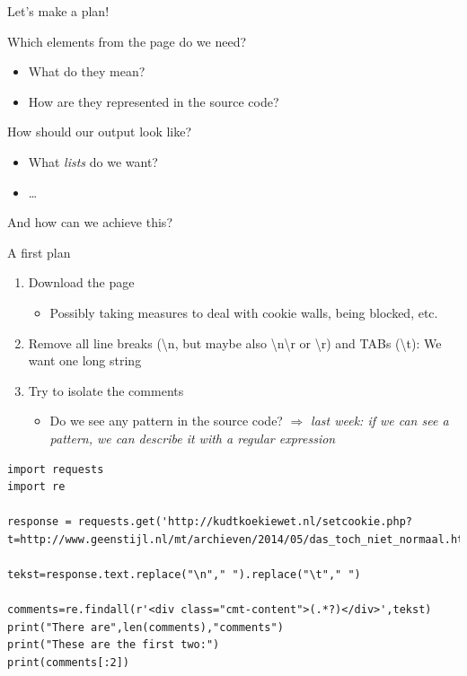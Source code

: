 \documentclass{beamer}
\begin{document}
\begin{frame}{Let's make a plan!}
\begin{block}{Which elements from the page do we need?}
\begin{itemize}
\item What do they mean?
\item How are they represented in the source code?
\end{itemize}
\end{block}
\begin{block}{How should our output look like?}
\begin{itemize}
\item What \emph{lists} do we want?
\item \ldots
\end{itemize}
\end{block}
And how can we achieve this?
\end{frame}


\begin{frame}{}
\begin{block}{A first plan}
\begin{enumerate}
\item<2-> Download the page
   \begin{itemize}
   \item<3-> Possibly taking measures to deal with cookie walls, being blocked, etc.
   \end{itemize}
\item<4-> Remove all line breaks (\textbackslash n, but maybe also \textbackslash n\textbackslash r or \textbackslash r) and TABs (\textbackslash t): We want one long string
\item<5-> Try to isolate the comments
   \begin{itemize}
   	\item<5-> Do we see any pattern in the source code? $\Rightarrow$ \emph{last week: if we can see a pattern, we can describe it with a regular expression}
   \end{itemize}
\end{enumerate}
\end{block}

\end{frame}

\begin{frame}
\begin{lstlisting}
import requests
import re

response = requests.get('http://kudtkoekiewet.nl/setcookie.php?t=http://www.geenstijl.nl/mt/archieven/2014/05/das_toch_niet_normaal.html')

tekst=response.text.replace("\n"," ").replace("\t"," ")

comments=re.findall(r'<div class="cmt-content">(.*?)</div>',tekst)
print("There are",len(comments),"comments")
print("These are the first two:")
print(comments[:2])
\end{lstlisting}
\end{frame}
\end{document}

